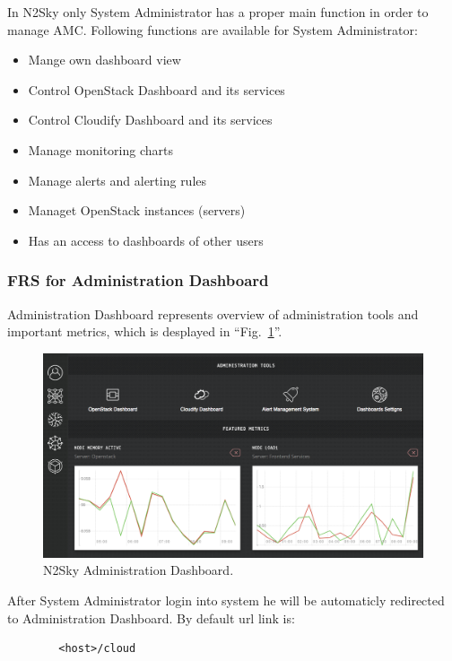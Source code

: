 In N2Sky only System Administrator has a proper main function in order to manage AMC.
Following functions are available for System Administrator:
\begin{itemize}
\item Mange own dashboard view
\item Control OpenStack Dashboard and its services
\item Control Cloudify Dashboard and its services
\item Manage monitoring charts
\item Manage alerts and alerting rules
\item Managet OpenStack instances (servers)
\item Has an access to dashboards of other users
\end{itemize}



\subsubsection{FRS for Administration Dashboard}\label{Administration Dashboard}

Administration Dashboard represents overview of administration tools and important metrics, which is desplayed in ``Fig.~\ref{fig:admin_dashboard}''. 

\begin{figure}[htbp]
\begin{center}
  \includegraphics[width=\linewidth]{components/4/pics/admin_dashboard.png}
  \caption{N2Sky Administration Dashboard.}
  \label{fig:admin_dashboard}
\end{center}
\end{figure}

After System Administrator login into system he will be automaticly redirected to Administration Dashboard. By default url link is:
\begin{lstlisting}
		<host>/cloud
\end{lstlisting}

